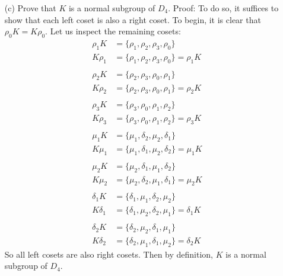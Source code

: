\documentclass{article}
\begin{document}
\begin{enumerate}
    \item[(c)] Prove that $K$ is a normal subgroup of $D_4$. 
    \newline\newline
    Proof: To do so, it suffices to show that each left coset is also a right coset. To begin, it is clear that $\rho_0 K = K \rho_0$. Let us inspect the remaining cosets:
    \begin{align*}
        \rho_1K &= \{\rho_1, \rho_2, \rho_3, \rho_0\} \\
        K\rho_1 &= \{\rho_1, \rho_2, \rho_3, \rho_0\} = \rho_1K\\ \\
        \rho_2K &= \{\rho_2, \rho_3, \rho_0, \rho_1\} \\
        K\rho_2 &= \{\rho_2, \rho_3, \rho_0, \rho_1\} = \rho_2K\\ \\
        \rho_3K &= \{\rho_3, \rho_0, \rho_1, \rho_2\} \\
        K\rho_3 &= \{\rho_3, \rho_0, \rho_1, \rho_2\} = \rho_3K \\ \\
        \mu_1K &= \{\mu_1, \delta_2, \mu_2, \delta_1\} \\
        K\mu_1 &= \{\mu_1, \delta_1, \mu_2, \delta_2\} = \mu_1K \\ \\
        \mu_2K &= \{\mu_2, \delta_1, \mu_1, \delta_2\} \\
        K\mu_2 &= \{\mu_2, \delta_2, \mu_1, \delta_1\} = \mu_2K \\ \\
        \delta_1K &= \{\delta_1, \mu_1, \delta_2, \mu_2\} \\
        K\delta_1 &= \{\delta_1, \mu_2, \delta_2, \mu_1\} = \delta_1K \\ \\
        \delta_2K &= \{\delta_2, \mu_2, \delta_1, \mu_1\} \\
        K\delta_2 &= \{\delta_2, \mu_1, \delta_1, \mu_2\} = \delta_2K
    \end{align*}
    So all left cosets are also right cosets. Then by definition, $K$ is a normal subgroup of $D_4$.
    

\end{enumerate}
\end{document}
